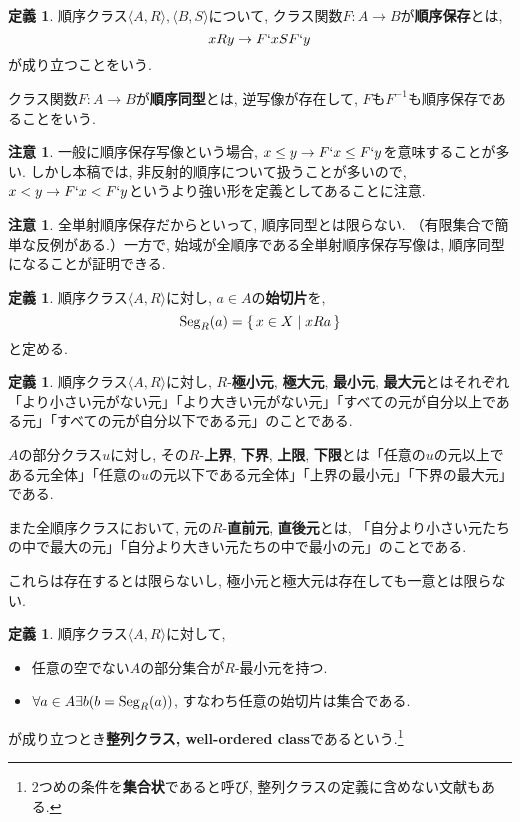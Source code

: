 \documentclass[a4paper, twoside]{bxjsarticle}
\theoremstyle{definition}
\newtheorem{defn}[thm]{定義}
\newtheorem{rem}[thm]{注意}
\begin{document}
        \begin{defn}
            順序クラス$\langle A, R\rangle, \langle B, S\rangle$について, クラス関数$F\colon A\to B$が\textbf{順序保存}とは, \[xRy \to F`x S F`y\]が成り立つことをいう.

            クラス関数$F\colon A\to B$が\textbf{順序同型}とは, 逆写像が存在して, $F$も$F^{-1}$も順序保存であることをいう.
        \end{defn}
        \begin{rem}
            一般に順序保存写像という場合, $x\leq y\to F`x \leq F`y$を意味することが多い. しかし本稿では, 非反射的順序について扱うことが多いので, $x<y\to F`x<F`y$というより強い形を定義としてあることに注意.
        \end{rem}
        \begin{rem}
            全単射順序保存だからといって, 順序同型とは限らない. （有限集合で簡単な反例がある.）一方で, 始域が全順序である全単射順序保存写像は, 順序同型になることが証明できる.
        \end{rem}
        \begin{defn}
            順序クラス$\langle A, R\rangle$に対し, $a\in A$の\textbf{始切片}を,\[{\rm Seg}_R(a) = \set{x\in X|xRa}\]と定める.
        \end{defn}
        \begin{defn}
            順序クラス$\langle A, R\rangle$に対し, $R$-\textbf{極小元}, \textbf{極大元}, \textbf{最小元}, \textbf{最大元}とはそれぞれ「より小さい元がない元」「より大きい元がない元」「すべての元が自分以上である元」「すべての元が自分以下である元」のことである.
            
            $A$の部分クラス$u$に対し, その$R$-\textbf{上界}, \textbf{下界}, \textbf{上限}, \textbf{下限}とは「任意の$u$の元以上である元全体」「任意の$u$の元以下である元全体」「上界の最小元」「下界の最大元」である.
            
            また全順序クラスにおいて, 元の$R$-\textbf{直前元}, \textbf{直後元}とは, 「自分より小さい元たちの中で最大の元」「自分より大きい元たちの中で最小の元」のことである.
            
            これらは存在するとは限らないし, 極小元と極大元は存在しても一意とは限らない.
        \end{defn}
        \begin{defn}
            順序クラス$\langle A, R\rangle$に対して, 
            \begin{itemize}
                \item 任意の空でない$A$の部分集合が$R$-最小元を持つ.
                \item $\forall a\in A \exists b(b = {\rm Seg}_R(a))$, すなわち任意の始切片は集合である.
            \end{itemize}
            が成り立つとき\textbf{整列クラス, well-ordered class}であるという.\footnote{2つめの条件を\textbf{集合状}であると呼び, 整列クラスの定義に含めない文献もある.}
        \end{defn}
\end{document}
